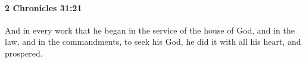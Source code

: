 
		\paragraph{2 Chronicles 31:21} %
			\label{2CHRONICLES-31-21}

			And in every work that he began in the service of the house of God, and in the law, and in the commandments, to seek his God, he did it with all his heart, and prospered.

